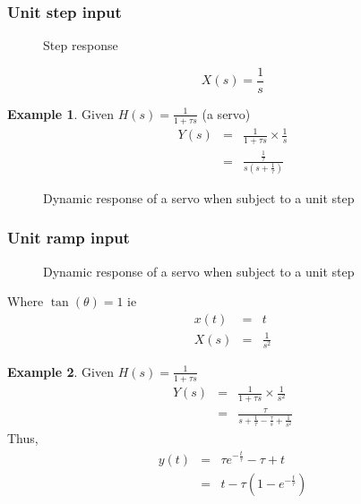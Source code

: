 \documentclass[11pt]{article} %
\theoremstyle{definition}
\newtheorem{example}{Example}[subsection]
\begin{document}
\subsubsection{Unit step input}
	\begin{figure}[h]
		\centering
		\caption{Step response}
	\end{figure}
	\begin{equation}
		X(s)=\frac{1}{s}
	\end{equation}
	\begin{example}
		Given $H(s)=\frac{1}{1+\tau s}$ (a servo)
		\begin{eqnarray}
			Y(s) &=& \frac{1}{1+\tau s} \times \frac{1}{s} \nonumber \\
			&=& \frac{\frac{1}{\tau}}{s\left( s+ \frac{1}{\tau}\right)}
		\end{eqnarray}

		\begin{figure}[h]
			\centering
			\caption{Dynamic response of a servo when subject to a unit step}
		\end{figure}
	\end{example}


\subsubsection{Unit ramp input}
	\begin{figure}[h]
		\centering
		\caption{Dynamic response of a servo when subject to a unit step}
	\end{figure}
	Where $\tan {(\theta)} = 1$ ie
	\begin{eqnarray}
		x(t) &=& t \nonumber \\
		X(s) &=& \frac{1}{s^2}
	\end{eqnarray}

	\begin{example}
	Given $H(s) = \frac{1}{1+\tau s}$
	\begin{eqnarray}
		Y(s) &=& \frac{1}{1+\tau s} \times \frac{1}{s^2}  \nonumber  \\
		&=& \frac{\tau}{s+\frac{1}{\tau} - \frac{\tau}{s} + \frac{1}{s^2}}
	\end{eqnarray}
	Thus,
	\begin{eqnarray}
		y(t) &=& \tau e^{-\frac{t}{\tau}} - \tau + t \nonumber \\
		&=& t-\tau\left(1-e^{-\frac{t}{\tau}}\right)
	\end{eqnarray}
	\end{example}
\end{document}
